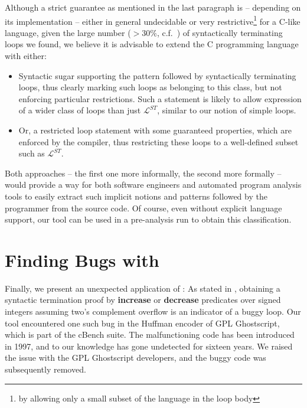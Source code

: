  Although a strict guarantee as mentioned in the last paragraph is -- depending on its implementation -- either in general undecidable or very restrictive\footnote{by allowing only a small subset of the language in the loop body} for a C-like language, given the large number ($> 30\%$, c.f.\ ) of syntactically terminating loops we found, we believe it is advisable to extend the C programming language with either:

 \begin{itemize}
     \item Syntactic sugar supporting the pattern followed by syntactically terminating loops, thus clearly marking such loops as belonging to this class, but not enforcing particular restrictions. Such a statement is likely to allow expression of a wider class of loops than just $\mathcal{L}^{ST}$, similar to our notion of simple loops.
     \item Or, a restricted loop statement with some guaranteed properties, which are enforced by the compiler, thus restricting these loops to a well-defined subset such as $\mathcal{L}^{ST}$.
 \end{itemize}

 Both approaches -- the first one more informally, the second more formally -- would provide a way for both software engineers and automated program analysis tools to easily extract such implicit notions and patterns followed by the programmer from the source code. Of course, even without explicit language support, our tool \sloopy{} can be used in a pre-analysis run to obtain this classification.


\section{Finding Bugs with \sloopy{}}
Finally, we present an unexpected application of \sloopy{}: As stated in , obtaining a syntactic termination proof by \textbf{increase} or \textbf{decrease} predicates over signed integers assuming two's complement overflow is an indicator of a buggy loop. Our tool \sloopy{} encountered one such bug in the Huffman encoder of GPL Ghostscript, which is part of the cBench suite. The malfunctioning code has been introduced in 1997, and to our knowledge has gone undetected for sixteen years. We raised the issue with the GPL Ghostscript developers, and the buggy code was subsequently removed.

